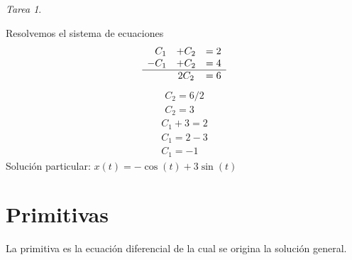 \documentclass[12pt]{article} %
\theoremstyle{remark} %
\newtheorem{tarea}{Tarea}[section] %
\newcounter{ejercicio}[tarea]
\begin{document}
\begin{tarea}
\begin{ejercicio}
  Resolvemos el sistema de ecuaciones
  \[
  \begin{array}{rcl}
    C_1 & + C_2 & = 2\\
    -C_1 & + C_2 & = 4\\
    \hline
         & 2C_2 & = 6
  \end{array}
  \]
  \begin{gather*}
    C_2 = 6/2\\
    C_2 = 3
  \end{gather*}
  \begin{gather*}
    C_1 + 3 = 2\\
    C_1 = 2 - 3\\
    C_1 = -1
  \end{gather*}
  Solución particular: $x(t) = - \cos(t) + 3 \sin(t)$
\end{ejercicio}
\end{tarea}

\section{Primitivas}
La primitiva es la ecuación diferencial de la cual se origina la solución general.
\end{document}
